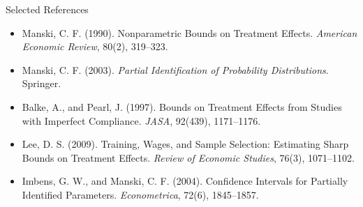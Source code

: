 \documentclass[aspectratio=169,11pt]{beamer}
\begin{document}
\begin{frame}{Selected References}
\small
\begin{itemize}
\item Manski, C. F. (1990). Nonparametric Bounds on Treatment Effects. \textit{American Economic Review}, 80(2), 319--323.
\item Manski, C. F. (2003). \textit{Partial Identification of Probability Distributions}. Springer.
\item Balke, A., and Pearl, J. (1997). Bounds on Treatment Effects from Studies with Imperfect Compliance. \textit{JASA}, 92(439), 1171--1176.
\item Lee, D. S. (2009). Training, Wages, and Sample Selection: Estimating Sharp Bounds on Treatment Effects. \textit{Review of Economic Studies}, 76(3), 1071--1102.
\item Imbens, G. W., and Manski, C. F. (2004). Confidence Intervals for Partially Identified Parameters. \textit{Econometrica}, 72(6), 1845--1857.
\end{itemize}
\end{frame}

\contactslide
\end{document}
